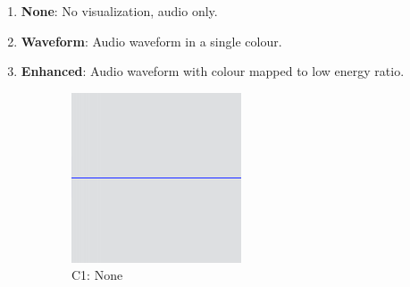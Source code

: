 \begin{enumerate}[label=C\arabic*.]
  \item \textbf{None}: No visualization, audio only.
  \item \textbf{Waveform}: Audio waveform in a single colour.
  \item \textbf{Enhanced}: Audio waveform with colour mapped to low energy ratio.
\end{enumerate}

\begin{figure}[t]
  \centering
  \begin{subfigure}{.3\textwidth}
    \centering
    \includegraphics[width=\columnwidth]{figs/condition1.png}
    \caption{C1: None}
  \end{subfigure}
  \begin{subfigure}{.3\textwidth}
    \centering

\end{subfigure}
\end{figure}
